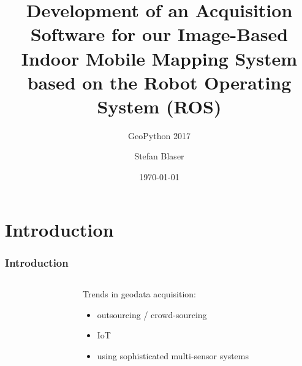 \documentclass[aspectratio=169]{beamer}
\begin{document}

\title{\textbf{Development of an Acquisition Software
	for our Image-Based Indoor Mobile Mapping System 
	based on the Robot Operating System (ROS)}}
\subtitle{GeoPython 2017}
\author{Stefan Blaser}
\date{\today}

\begin{frame}
 \titlepage
\end{frame}

\section{Introduction}

  \begin{frame}
   \frametitle{Introduction}
   \begin{columns}[onlytextwidth]
    \begin{column}{0.5\textwidth}
    
    
    \end{column}
    \begin{column}{0.5\textwidth}
    Trends in geodata acquisition:
      \begin{itemize}
       \item outsourcing / crowd-sourcing
       \item IoT
       \item using sophisticated multi-sensor systems
      \end{itemize}
    \end{column}
   \end{columns}
  \end{frame}
\end{document}
